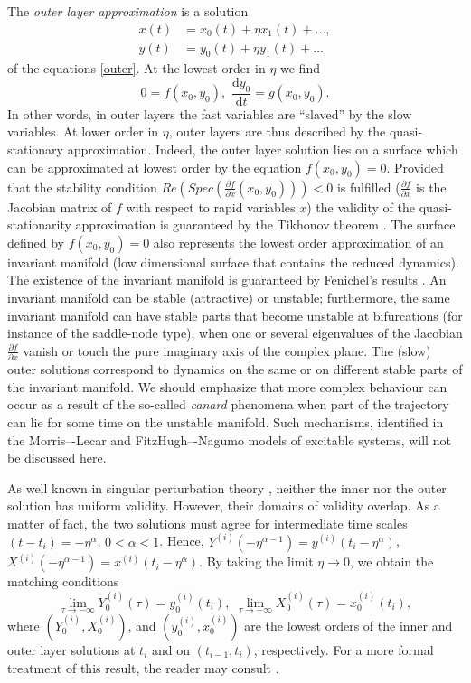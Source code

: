\documentclass{llncs}
\newcommand{\vect}[1]{\ensuremath{  #1 } }
\newcommand{\D}[2]{ \ensuremath{ \frac{\mathrm{d} #1 }{\mathrm{d} #2 } }}
\newcommand{\DP}[2]{ \ensuremath{ \frac{\partial #1 }{\partial #2 } } }
\begin{document}
The \textit{outer layer approximation} is a solution
\begin{align*}
x(t) &= x_0(t) + \eta x_1(t) + \ldots,\\
y(t) &= y_0(t) + \eta y_1(t) + \ldots\end{align*}
of the equations \eqref{outer}. At the lowest order in $\eta$ we find
\begin{equation}
0  = \vect{f}(\vect{x}_0,\vect{y}_0),\,\,
\D{\vect{y_0}}{t}  = g(\vect{x}_0,\vect{y}_0). \label{outer0}
\end{equation}
In other words, in outer layers the fast variables are ``slaved'' by the slow
variables.
At lower order in $\eta$, outer layers are thus described by the
quasi-stationary approximation. Indeed, the outer layer solution lies on a
surface which can be approximated at lowest order by
the equation $f(\vect{x}_0,\vect{y}_0)=0$. Provided that the stability condition
$Re ( Spec( \DP{f}{x}(x_0,y_0) ) ) < 0$ is fulfilled
($\DP{f}{x}$ is the Jacobian matrix
of $f$ with respect to rapid variables $x$) the validity of the quasi-stationarity
approximation is guaranteed by the
Tikhonov theorem  \cite{tikhonov1952systems}.
The surface defined by $f(\vect{x}_0,\vect{y}_0)=0$ also represents
the lowest order approximation of an invariant manifold (low dimensional surface
that contains the reduced dynamics). The existence
of the invariant manifold is guaranteed by Fenichel's results
\cite{fenichel1979geometric}.
An invariant manifold can be stable (attractive)
or unstable; furthermore, the same invariant manifold can have stable parts
that become unstable at bifurcations (for instance of the saddle-node type),
when one or several eigenvalues of  the Jacobian $\DP{f}{x}$ vanish or
touch the pure imaginary axis of the complex plane.
The (slow) outer solutions correspond to dynamics on the same or on different
stable parts of the invariant manifold.
 {We should emphasize that more complex behaviour can occur as a result of the so-called {\em canard} phenomena
when part of the trajectory can lie for some time on the unstable manifold. Such mechanisms, identified in the Morris–-Lecar and FitzHugh–-Nagumo models of excitable systems,
\cite{wechselberger2013canard} will not be discussed here.  }

 {As well known in singular perturbation theory \cite{lagerstrom1972basic},
neither the inner nor the outer solution has uniform validity. However, their domains of validity overlap. As a matter of fact, the two solutions}
must agree for intermediate time scales $(t-t_i) = -\eta^{\alpha}$, $0 < \alpha < 1$.
Hence,
$Y^{(i)}( -\eta^{\alpha-1} ) =  y^{(i)}( t_i - \eta^{\alpha} )$, $X^{(i)}( -\eta^{\alpha-1} ) =  x^{(i)}( t_i - \eta^{\alpha} )$. By taking the limit $\eta \to 0$, we obtain the matching conditions
 \begin{equation}
 \lim_{\tau \to -\infty} Y_0^{(i)}( \tau ) =  y_0^{(i)}(t_i), \,\, \lim_{\tau \to -\infty} X_0^{(i)}( \tau ) =  x_0^{(i)}(t_i), \label{matching1}
 \end{equation}
 where $(Y_0^{(i)},X_0^{(i)})$, and $(y_0^{(i)},x_0^{(i)})$ are the lowest orders of the
 inner and outer layer solutions at $t_i$ and on $(t_{i-1},t_i)$, respectively.
  {For a more formal treatment of this result, the reader may consult \cite{lagerstrom1972basic}.}
\end{document}
